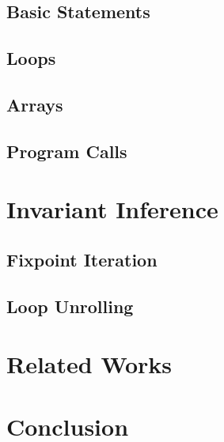 \documentclass[]{scrartcl}
\begin{document}
  \subsection{Basic Statements}
  \subsection{Loops}
  \subsection{Arrays}
  \subsection{Program Calls}

\section{Invariant Inference}

  \subsection{Fixpoint Iteration}

  \subsection{Loop Unrolling}

\section{Related Works}

\section{Conclusion}
\end{document}
